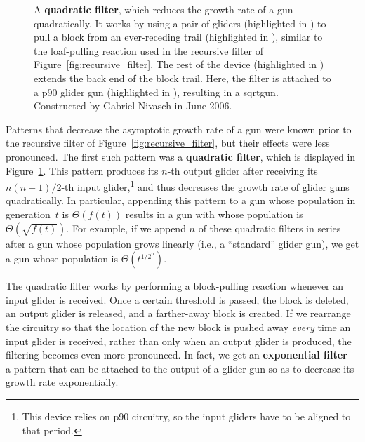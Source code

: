 \begin{figure}[!htb]
	\centering
	\caption{A \textbf{quadratic filter}, which reduces the growth rate of a gun quadratically. It works by using a pair of gliders (highlighted in ) to pull a block from an ever-receding trail (highlighted in ), similar to the loaf-pulling reaction used in the recursive filter of Figure~\ref{fig:recursive_filter}. The rest of the device (highlighted in ) extends the back end of the block trail. Here, the filter is attached to a p$90$ glider gun (highlighted in ), resulting in a sqrtgun. Constructed by Gabriel Nivasch in June 2006.}\label{fig:quadratic_filter}
\end{figure}

Patterns that decrease the asymptotic growth rate of a gun were known prior to the recursive filter of Figure~\ref{fig:recursive_filter}, but their effects were less pronounced. The first such pattern was a \textbf{quadratic filter}, which is displayed in Figure~\ref{fig:quadratic_filter}. This pattern produces its $n$-th output glider after receiving its $n(n+1)/2$-th input glider,\footnote{This device relies on p$90$ circuitry, so the input gliders have to be aligned to that period.} and thus decreases the growth rate of glider guns quadratically. In particular, appending this pattern to a gun whose population in generation~$t$ is $\Theta(f(t))$ results in a gun with whose population is $\Theta(\sqrt{f(t)})$. For example, if we append $n$ of these quadratic filters in series after a gun whose population grows linearly (i.e., a ``standard'' glider gun), we get a gun whose population is $\Theta(t^{1/2^n})$.

The quadratic filter works by performing a block-pulling reaction whenever an input glider is received. Once a certain threshold is passed, the block is deleted, an output glider is released, and a farther-away block is created. If we rearrange the circuitry so that the location of the new block is pushed away \emph{every} time an input glider is received, rather than only when an output glider is produced, the filtering becomes even more pronounced. In fact, we get an \textbf{exponential filter}---a pattern that can be attached to the output of a glider gun so as to decrease its growth rate exponentially.

